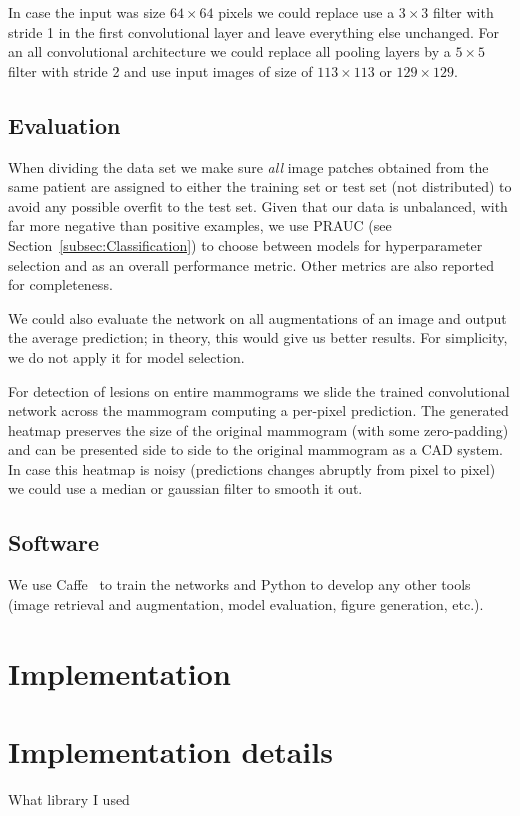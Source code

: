 	In case the input was size $64 \times 64$ pixels we could replace use a $3 \times 3$ filter with stride 1 in the first convolutional layer and leave everything else unchanged. For an all convolutional architecture we could replace all pooling layers by a $5 \times 5$ filter  with stride 2 and use input images of size of $113 \times 113$ or $129 \times 129$.

	\subsection{Evaluation}
	When dividing the data set we make sure \textit{all} image patches obtained from the same patient are assigned to either the training set or test set (not distributed) to avoid any possible overfit to the test set. Given that our data is unbalanced, with far more negative than positive examples, we use PRAUC (see Section~\ref{subsec:Classification}) to choose between models for hyperparameter selection and as an overall performance metric. Other metrics are also reported for completeness. 

	We could also evaluate the network on all augmentations of an image and output the average prediction; in theory, this would give us better results. For simplicity, we do not apply it for model selection.

	For detection of lesions on entire mammograms we slide the trained convolutional network across the mammogram computing a per-pixel prediction. The generated heatmap preserves the size of the original mammogram (with some zero-padding) and can be presented side to side to the original mammogram as a CAD system. In case this heatmap is noisy (predictions changes abruptly from pixel to pixel) we could use a median or gaussian filter to smooth it out.%

	\subsection{Software}
	We use Caffe~\cite{Jia2014} to train the networks and Python to develop any other tools (image retrieval and augmentation, model evaluation, figure generation, etc.).


\section{Implementation}

\section{Implementation details}
What library I used

